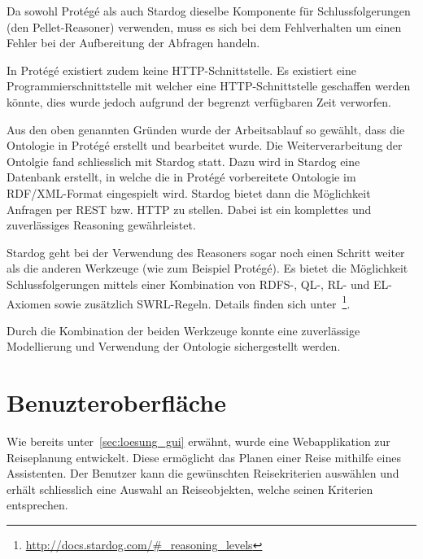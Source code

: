 Da sowohl Protégé als auch Stardog dieselbe Komponente für Schlussfolgerungen (den Pellet-Reasoner) verwenden, muss es sich bei dem Fehlverhalten um einen Fehler bei der Aufbereitung der Abfragen handeln.

In Protégé existiert zudem keine HTTP-Schnittstelle. Es existiert eine Programmierschnittstelle mit welcher eine HTTP-Schnittstelle geschaffen werden könnte, dies wurde jedoch aufgrund der begrenzt verfügbaren Zeit verworfen.

Aus den oben genannten Gründen wurde der Arbeitsablauf so gewählt, dass die Ontologie in Protégé erstellt und bearbeitet wurde. Die Weiterverarbeitung der Ontolgie fand schliesslich mit Stardog statt. Dazu wird in Stardog eine Datenbank erstellt, in welche die in Protégé vorbereitete Ontologie im RDF/XML-Format eingespielt wird. Stardog bietet dann die Möglichkeit Anfragen per REST bzw. HTTP zu stellen. Dabei ist ein komplettes und zuverlässiges Reasoning gewährleistet.

Stardog geht bei der Verwendung des Reasoners sogar noch einen Schritt weiter als die anderen Werkzeuge (wie zum Beispiel Protégé). Es bietet die Möglichkeit Schlussfolgerungen mittels einer Kombination von RDFS-, QL-, RL- und EL-Axiomen sowie zusätzlich SWRL-Regeln. Details finden sich unter~\footnote{\url{http://docs.stardog.com/\#_reasoning_levels}}.

Durch die Kombination der beiden Werkzeuge konnte eine zuverlässige Modellierung und Verwendung der Ontologie sichergestellt werden.

\section{Benuzteroberfläche}
\label{sec:komponenten:ember}
Wie bereits unter~\autoref{sec:loesung_gui} erwähnt, wurde eine Webapplikation zur Reiseplanung entwickelt. Diese ermöglicht das Planen einer Reise mithilfe eines Assistenten. Der Benutzer kann die gewünschten Reisekriterien auswählen und erhält schliesslich eine Auswahl an Reiseobjekten, welche seinen Kriterien entsprechen.

